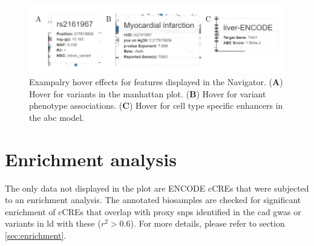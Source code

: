     \begin{figure}[h!]
    \capstart
        \centering
        \includegraphics{Abbildung/GWAS_navigator_hover.pdf}

        \begin{minipage}{\captionwidth}
            \caption[database]{\newline
            Exampalry hover effects for features displayed in the  Navigator. (\textbf{A}) Hover for variants in the manhattan plot. (\textbf{B}) Hover for variant phenotype associations. (\textbf{C}) Hover for cell type specific enhancers in the \ac{abc} model.}
            \label{fig:GWAS_navigator_hover}
        \end{minipage}
    \end{figure}

\section{Enrichment analysis}
\label{sec:result_enrichment}
The only data not displayed in the plot are ENCODE \acp{cCRE} that were subjected to an enrichment analysis. The annotated biosamples are checked for significant enrichment of \acp{cCRE} that overlap with proxy \acp{snp} identified in the \ac{cad} \ac{gwas} or variants in \ac{ld} with these ($r^2 > 0.6$). For more details, please refer to section \ref{sec:enrichment}.

